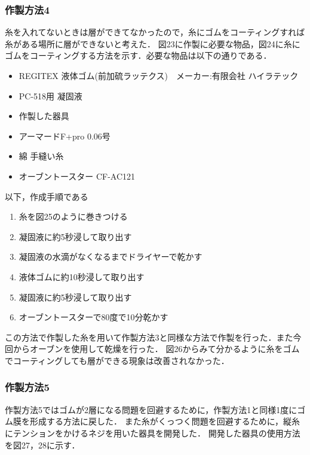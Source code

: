 \subsubsection{作製方法4}
糸を入れてないときは層ができてなかったので，糸にゴムをコーティングすれば糸がある場所に層ができないと考えた．
図23に作製に必要な物品，図24に糸にゴムをコーティングする方法を示す．必要な物品は以下の通りである．
\begin{itemize}
  \item REGITEX 液体ゴム(前加硫ラッテクス)　メーカー:有限会社 ハイラテック
  \item PC-518用 凝固液
  \item 作製した器具
  \item アーマードF+pro 0.06号
  \item 綿 手縫い糸
  \item オーブントースター CF-AC121
\end{itemize}
以下，作成手順である
\begin{enumerate}
  \item 糸を図25のように巻きつける
  \item 凝固液に約5秒浸して取り出す
  \item 凝固液の水滴がなくなるまでドライヤーで乾かす
  \item 液体ゴムに約10秒浸して取り出す
  \item 凝固液に約5秒浸して取り出す
  \item オーブントースターで80度で10分乾かす
\end{enumerate}
この方法で作製した糸を用いて作製方法3と同様な方法で作製を行った．また今回からオーブンを使用して乾燥を行った．
図26からみて分かるように糸をゴムでコーティングしても層ができる現象は改善されなかった．
\subsubsection{作製方法5}
作製方法5ではゴムが2層になる問題を回避するために，作製方法1と同様1度にゴム膜を形成する方法に戻した．
また糸がくっつく問題を回避するために，縦糸にテンションをかけるネジを用いた器具を開発した．
開発した器具の使用方法を図27，28に示す．


